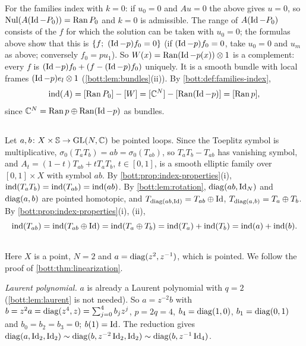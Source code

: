 For the families index with $k=0$: if $u_0=0$ and $Au=0$ the above gives $u=0$, so
$\operatorname{Nul}(A(\operatorname{Id}-P_0))=\operatorname{Ran} P_0$ and $k=0$ is admissible. The range of $A(\operatorname{Id}-P_0)$ consists of
the $f$ for which the solution can be taken with $u_0=0$; the formulas above show that this is
$\{f;\ (\Id-p)f_0=0\}$ (if $(\operatorname{Id}-p)f_0=0$, take $u_0=0$ and $u_m$ as above; conversely
$f_0=pu_1$). So $W(x)=\operatorname{Ran}(\operatorname{Id}-p(x))\otimes1$ is a complement: every $f$ is
$(\operatorname{Id}-p)f_0+(f-(\operatorname{Id}-p)f_0)$ uniquely. It is a smooth bundle with local frames
$(\operatorname{Id}-p)e_l\otimes1$ (\cref{bott:lem:bundles}(ii)). By \cref{bott:def:families-index},
\begin{equation*}
  \operatorname{ind}(A)=[\operatorname{Ran} P_0]-[W]=[\mathbb{C}^N]-[\operatorname{Ran}(\operatorname{Id}-p)]=[\operatorname{Ran} p],
\end{equation*}
since $\mathbb{C}^N=\operatorname{Ran} p\oplus\operatorname{Ran}(\operatorname{Id}-p)$ as bundles.

\subsection*{}
Let $a,b\colon X\times\mathbb{S}\to\operatorname{GL}(N,\mathbb{C})$ be pointed loops. Since the Toeplitz symbol is
multiplicative, $\sigma_0(T_aT_b)=ab=\sigma_0(T_{ab})$, so $T_aT_b-T_{ab}$ has vanishing
symbol, and $A_t=(1-t)T_{ab}+tT_aT_b$, $t\in[0,1]$, is a smooth elliptic family over
$[0,1]\times X$ with symbol $ab$. By \cref{bott:prop:index-properties}(i),
$\operatorname{ind}(T_aT_b)=\operatorname{ind}(T_{ab})=\operatorname{ind}(ab)$. By \cref{bott:lem:rotation}, $\operatorname{diag}(ab,\operatorname{Id}_N)$ and
$\operatorname{diag}(a,b)$ are pointed homotopic, and $T_{\operatorname{diag}(ab,\operatorname{Id})}=T_{ab}\oplus\operatorname{Id}$,
$T_{\operatorname{diag}(a,b)}=T_a\oplus T_b$. By \cref{bott:prop:index-properties}(i), (ii),
\begin{equation*}
  \operatorname{ind}(T_{ab})=\operatorname{ind}(T_{ab}\oplus\operatorname{Id})=\operatorname{ind}(T_a\oplus T_b)=\operatorname{ind}(T_a)+\operatorname{ind}(T_b)=\operatorname{ind}(a)+\operatorname{ind}(b).
\end{equation*}

\subsection*{}
Here $X$ is a point, $N=2$ and $a=\operatorname{diag}(z^2,z^{-1})$, which is pointed. We follow the proof
of \cref{bott:thm:linearization}.

\emph{Laurent polynomial.} $a$ is already a Laurent polynomial with $q=2$
(\cref{bott:lem:laurent} is not needed). So $a=z^{-2}b$ with
$b=z^2a=\operatorname{diag}(z^4,z)=\sum_{j=0}^4b_jz^j$, $p=2q=4$, $b_4=\operatorname{diag}(1,0)$, $b_1=\operatorname{diag}(0,1)$ and
$b_0=b_2=b_3=0$; $b(1)=\operatorname{Id}$. The reduction gives
$\operatorname{diag}(a,\operatorname{Id}_2,\operatorname{Id}_2)\sim\operatorname{diag}(b,z^{-2}\operatorname{Id}_2,\operatorname{Id}_2)\sim\operatorname{diag}(b,z^{-1}\operatorname{Id}_4)$.

